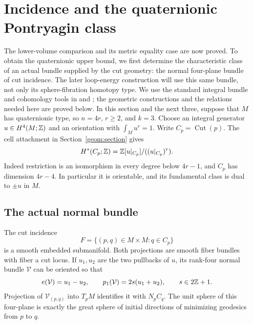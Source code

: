\section{Incidence and the quaternionic Pontryagin class}
\label{inc:section}

The lower-volume comparison and its metric equality case are now
proved. To obtain the quaternionic upper bound, we first determine
the characteristic class of an actual bundle supplied by the cut
geometry: the normal four-plane bundle of cut incidence.
The later loop-energy construction will use this same bundle,
not only its sphere-fibration homotopy type.
We use the standard integral bundle and cohomology tools in
\citet{Hatcher2002} and \citet{MilnorStasheff1974}; the geometric
constructions and the relations needed here are proved below.
In this section and the next three, suppose that $M$ has quaternionic
type, so $n=4r$, $r\ge2$, and $k=3$. Choose an integral generator
$u\in H^4(M;\mathbb Z)$ and an orientation with $\int_Mu^r=1$.
Write $C_p=\operatorname{Cut}(p)$. The cell attachment in
Section~\ref{geom:section} gives
\[
 H^*(C_p;\mathbb Z)=\mathbb Z[u|_{C_p}]/((u|_{C_p})^r).
\]
Indeed restriction is an isomorphism in every degree below $4r-1$,
and $C_p$ has dimension $4r-4$. In particular it is orientable,
and its fundamental class is dual to $\pm u$ in $M$.

\subsection{The actual normal bundle}

\begin{proposition}\label{inc:normal}
The cut incidence
\[
 F=\{(p,q)\in M\times M:q\in C_p\}
\]
is a smooth embedded submanifold. Both projections are smooth
fiber bundles with fiber a cut locus. If $u_1,u_2$ are the two
pullbacks of $u$, its rank-four normal bundle $\mathcal V$ can be oriented
so that
\begin{equation}\label{inc:normal-classes}
 e(\mathcal V)=u_1-u_2,\qquad p_1(\mathcal V)=2s(u_1+u_2),\qquad s\in2\mathbb Z+1.
\end{equation}
Projection of $\mathcal V_{(p,q)}$ into $T_pM$ identifies it with
$N_pC_q$. The unit sphere of this four-plane is exactly the
great sphere of initial directions of minimizing geodesics
from $p$ to $q$.
\end{proposition}

